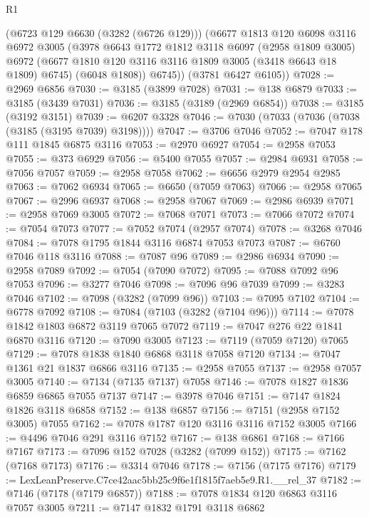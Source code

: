 \begin{lexlean}{R1}
\begin{coremodule}
        (@6723 @129 @6630 (@3282 (@6726 @129)))
        (@6677
          @1813
          @120
          @6098
          @3116
          @6972
          @3005
          (@3978
            @6643
            @1772
            @1812
            @3118
            @6097
            (@2958 @1809 @3005)
            @6972
            (@6677 @1810 @120 @3116 @3116 @1809 @3005 (@3418 @6643 @18 @1809) @6745)
            (@6048 @1808))
          @6745))
      (@3781 @6427 @6105))
@7028 := @2969 @6856
@7030 := @3185 (@3899 @7028)
@7031 := @138 @6879
@7033 := @3185 (@3439 @7031)
@7036 := @3185 (@3189 (@2969 @6854))
@7038 := @3185 (@3192 @3151)
@7039 := @6207 @3328
@7046 := @7030 (@7033 (@7036 (@7038 (@3185 (@3195 @7039) @3198))))
@7047 := @3706 @7046
@7052 := @7047 @178 @111 @1845 @6875 @3116
@7053 := @2970 @6927
@7054 := @2958 @7053
@7055 := @373 @6929
@7056 := @5400 @7055
@7057 := @2984 @6931
@7058 := @7056 @7057
@7059 := @2958 @7058
@7062 := @6656 @2979 @2954 @2985
@7063 := @7062 @6934
@7065 := @6650 (@7059 @7063)
@7066 := @2958 @7065
@7067 := @2996 @6937
@7068 := @2958 @7067
@7069 := @2986 @6939
@7071 := @2958 @7069 @3005
@7072 := @7068 @7071
@7073 := @7066 @7072
@7074 := @7054 @7073
@7077 := @7052 @7074 (@2957 @7074)
@7078 := @3268 @7046
@7084 := @7078 @1795 @1844 @3116 @6874 @7053 @7073
@7087 := @6760 @7046 @118 @3116
@7088 := @7087 @96
@7089 := @2986 @6934
@7090 := @2958 @7089
@7092 := @7054 (@7090 @7072)
@7095 := @7088 @7092 @96 @7053
@7096 := @3277 @7046
@7098 := @7096 @96 @7039
@7099 := @3283 @7046
@7102 := @7098 (@3282 (@7099 @96))
@7103 := @7095 @7102
@7104 := @6778 @7092
@7108 := @7084 (@7103 (@3282 (@7104 @96)))
@7114 := @7078 @1842 @1803 @6872 @3119 @7065 @7072
@7119 := @7047 @276 @22 @1841 @6870 @3116
@7120 := @7090 @3005
@7123 := @7119 (@7059 @7120) @7065
@7129 := @7078 @1838 @1840 @6868 @3118 @7058 @7120
@7134 := @7047 @1361 @21 @1837 @6866 @3116
@7135 := @2958 @7055
@7137 := @2958 @7057 @3005
@7140 := @7134 (@7135 @7137) @7058
@7146 := @7078 @1827 @1836 @6859 @6865 @7055 @7137
@7147 := @3978 @7046
@7151 := @7147 @1824 @1826 @3118 @6858
@7152 := @138 @6857
@7156 := @7151 (@2958 @7152 @3005) @7055
@7162 := @7078 @1787 @120 @3116 @3116 @7152 @3005
@7166 := @4496 @7046 @291 @3116 @7152
@7167 := @138 @6861
@7168 := @7166 @7167
@7173 := @7096 @152 @7028 (@3282 (@7099 @152))
@7175 := @7162 (@7168 @7173)
@7176 := @3314 @7046
@7178 := @7156 (@7175 @7176)
@7179 := LexLeanPreserve.C7ce42aac5bb25c9f6e1f1815f7aeb5e9.R1.__rel_37
@7182 := @7146 (@7178 (@7179 @6857))
@7188 := @7078 @1834 @120 @6863 @3116 @7057 @3005
@7211 := @7147
    @1832
    @1791
    @3118
    @6862

\end{coremodule}
\end{lexlean}
